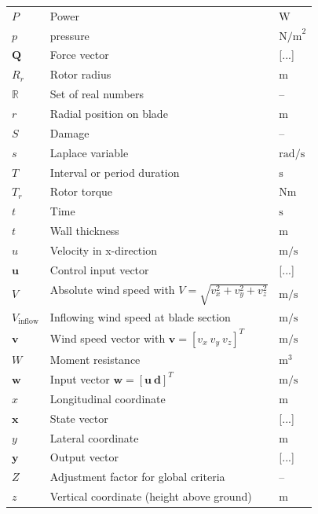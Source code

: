 \begin{longtable}{lll}
    $P$ & Power & $\mathrm{W}$ \\
    $p$ & pressure &  $\mathrm{N/m}^2$ \\
    $\mathbf{Q}$  & Force vector & [...] \\
    $R_r$ & Rotor radius & $\mathrm{m}$ \\
    $\mathbb{R}$ & Set of real numbers & -- \\
    $r$ & Radial position on blade & $\mathrm{m}$ \\
    $S$ & Damage & -- \\
    $s$ & Laplace variable & $\mathrm{rad/s}$ \\
    $T$ & Interval or period duration & $\mathrm{s}$ \\
    $T_r$ & Rotor torque & $\mathrm{Nm}$ \\
    $t$ & Time & $\mathrm{s}$ \\
    $t$ & Wall thickness & $\mathrm{m}$ \\
    $u$ & Velocity in x-direction & $\mathrm{m/s}$ \\
    $\bm{u}$ & Control input vector & [...] \\
    $V$ & Absolute wind speed with $V = \sqrt{v_x^2 + v_y^2 + v_z^2}$& $\mathrm{m/s}$ \\
    $V_{\text{inflow}}$ & Inflowing wind speed at blade section &  $\mathrm{m/s}$\\
    $\bm{v}$ & Wind speed vector with $\bm{v} = [v_x\ v_y\ v_z]^T$ & $\mathrm{m/s}$ \\
    $W$ & Moment resistance & $\mathrm{m}^3$ \\
    $\bm{w}$ & Input vector $\bm{w}=[\bm{u}\ \bm{d}]^T$  & $\mathrm{m/s}$ \\
    $x$ & Longitudinal coordinate & $\mathrm{m}$ \\
    $\bm{x}$ & State vector & [...] \\
    $y$ & Lateral coordinate & $\mathrm{m}$ \\
    $\bm{y}$ & Output vector & [...] \\
    $Z$ & Adjustment factor for global criteria & -- \\
    $z$ & Vertical coordinate (height above ground) & $\mathrm{m}$ \\
    
\end{longtable}

